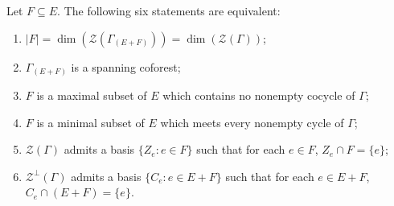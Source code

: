 Let $F \subseteq E$. The following six statements are equivalent:
\begin{enumerate}
\item[(a)] $|F| = \dim(\mathcal{Z}(\Gamma_{(E+F)})) = \dim(\mathcal{Z}(\Gamma))$;
\item[(b)] $\Gamma_{(E+F)}$ is a spanning coforest;
\item[(c)] $F$ is a maximal subset of $E$ which contains no nonempty cocycle of $\Gamma$;
\item[(d)] $F$ is a minimal subset of $E$ which meets every nonempty cycle of $\Gamma$;
\item[(e)] $\mathcal{Z}(\Gamma)$ admits a basis $\{Z_e : e \in F\}$ such that for each $e \in F$, $Z_e \cap F = \{e\}$;
\item[(f)] $\mathcal{Z}^\perp(\Gamma)$ admits a basis $\{C_e : e \in E + F\}$ such that for each $e \in E + F$, $C_e \cap (E + F) = \{e\}$.
\end{enumerate}